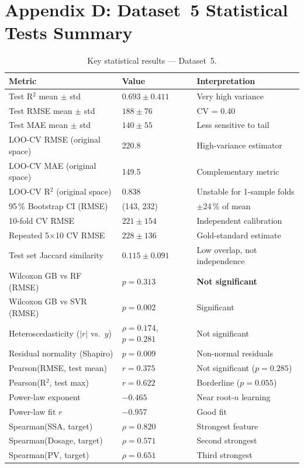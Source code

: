 \documentclass[12pt,a4paper]{article}
\begin{document}
\section*{Appendix D: Dataset~5 Statistical Tests Summary}
\label{app:ds5_stats}

\begin{table}[h]
\centering
\caption{Key statistical results — Dataset~5.}
\label{tab:ds5_stats_summary}
\begin{tabular}{lll}
\toprule
Metric & Value & Interpretation \\
\midrule
Test R$^2$ mean $\pm$ std & $0.693 \pm 0.411$ & Very high variance \\
Test RMSE mean $\pm$ std & $188 \pm 76$ & CV = 0.40 \\
Test MAE mean $\pm$ std & $140 \pm 55$ & Less sensitive to tail \\
LOO-CV RMSE (original space) & 220.8 & High-variance estimator \\
LOO-CV MAE  (original space) & 149.5 & Complementary metric \\
LOO-CV R$^2$ (original space) & 0.838 & Unstable for 1-sample folds \\
95\,\% Bootstrap CI (RMSE) & (143, 232) & $\pm$24\,\% of mean \\
10-fold CV RMSE & $221 \pm 154$ & Independent calibration \\
Repeated 5$\times$10 CV RMSE & $228 \pm 136$ & Gold-standard estimate \\
Test set Jaccard similarity & $0.115 \pm 0.091$ & Low overlap, not independence \\
Wilcoxon GB vs RF (RMSE) & $p = 0.313$ & \textbf{Not significant} \\
Wilcoxon GB vs SVR (RMSE) & $p = 0.002$ & Significant \\
Heteroscedasticity ($|r|$ vs.\ $y$) & $\rho = 0.174$, $p = 0.281$ & Not significant \\
Residual normality (Shapiro) & $p = 0.009$ & Non-normal residuals \\
Pearson(RMSE, test mean) & $r = 0.375$ & Not significant ($p=0.285$) \\
Pearson(R$^2$, test max) & $r = 0.622$ & Borderline ($p=0.055$) \\
Power-law exponent & $-0.465$ & Near root-$n$ learning \\
Power-law fit $r$ & $-0.957$ & Good fit \\
\midrule
Spearman(SSA, target) & $\rho = 0.820$ & Strongest feature \\
Spearman(Dosage, target) & $\rho = 0.571$ & Second strongest \\
Spearman(PV, target) & $\rho = 0.651$ & Third strongest \\
\bottomrule
\end{tabular}
\end{table}
\end{document}
